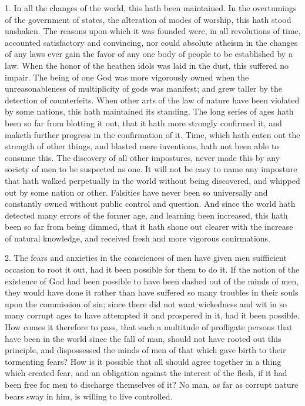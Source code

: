 \documentclass[a5paper]{book}
\begin{document}
1. In all the changes of the world, this hath been maintained. 
In the overtumings of the government of states, 
    the alteration of modes of worship, 
    this hath stood unshaken. 
The reasons upon which it was founded were, in all revolutions of time, 
    accounted satisfactory and convincing, 
    nor could absolute atheism in the changes of any laws 
    ever gain the favor of any one body of people to be established by a law. 
When the honor of the heathen idols was laid in the dust, 
    this suffered no impair. 
The being of one God was more vigorously owned when 
    the unreasonableness of multiplicity of gods was manifest; 
    and grew taller by the detection of counterfeits. 
When other arts of the law of nature have been violated by some nations, 
    this hath maintained its standing. 
The long series of ages hath been so far from blotting it out, 
    that it hath more strongly confirmed it, 
    and maketh further progress in the confirmation of it. 
Time, which hath eaten out the strength of other things, 
    and blasted mere inventions, hath not been able to consume this. 
The discovery of all other impostures, 
    never made this by any society of men to be suspected as one. 
It will not be easy to name any imposture that hath walked 
    perpetually in the world without being discovered, 
    and whipped out by some nation or other. 
Falsities have never been so universally and constantly owned 
    without public control and question. 
And since the world hath detected many errors of the former age, 
    and learning been increased, this hath been so far from being dimmed,
    that it hath shone out clearer with the increase of natural knowledge,
    and received fresh and more vigorous conirmations.

2. The fears and anxieties in the consciences of men have given
    men suifficient occasion to root it out, 
    had it been possible for them to do it. 
If the notion of the existence of God had been possible 
    to have been dashed out of the minds of men, 
    they would have done it rather than have suffered 
    so many troubles in their souls upon the commission of sin; 
    since there did not want wickedness and wit 
    in so many corrupt ages to have attempted it and prospered in it, 
    had it been possible. 
How comes it therefore to pass, 
    that such a multitude of profligate persons that have been in the world 
    since the fall of man, 
    should not have rooted out this principle, 
    and dispossessed the minds of men of that which gave birth 
    to their tormenting fears?
How is it possible that all should agree together in a thing which created fear, 
    and an obligation against the interest of the flesh, 
    if it had been free for men to discharge themselves of it? 
    No man, as far as corrupt nature bears sway in him, 
    is willing to live controlled.
\end{document}
